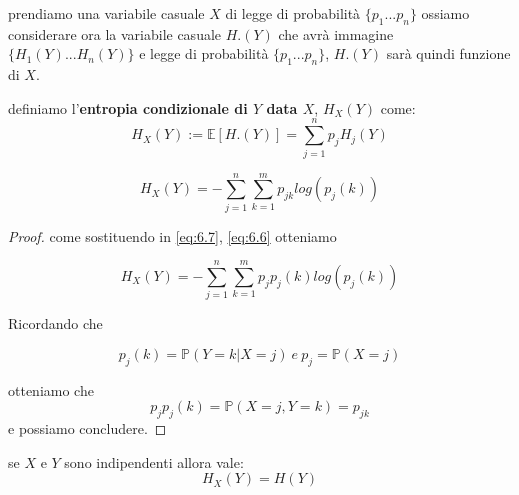 prendiamo una variabile casuale $X$ di legge di probabilità $\{ p _1...p_n\}$ ossiamo considerare ora la variabile casuale $H.(Y)$ che avrà immagine $\{H_1(Y)...H_n(Y) \}$ e legge di probabilità $\{ p _1...p_n\}$, $H.(Y)$ sarà quindi funzione di $X$.
\begin{defi}
definiamo l'\textbf{entropia condizionale di $Y$ data $X$}, $H_X(Y)$ come:
\begin{equation}\label{eq:6.7}
H_X(Y):= \mathbb{E}[H.(Y)]= \sum_{j=1}^n p_j H_j(Y)
\end{equation}
\end{defi}



\begin{lem}
\begin{equation}
H_X(Y)=-\sum_{j=1}^n\sum_{k=1}^m p_{jk}log(p_j(k))
\end{equation}
\end{lem}
\begin{proof}
come sostituendo in \ref{eq:6.7}, \ref{eq:6.6} otteniamo

$$H_X(Y)=-\sum_{j=1}^n\sum_{k=1}^m p_{j}p_j(k)log(p_j(k))$$

Ricordando che 

$$p_j(k)=\mathbb{P}(Y=k|X=j)\ e \ p_j=\mathbb{P}(X=j)$$

otteniamo che 
$$p_jp_j(k)=\mathbb{P}(X=j,Y=k)=p_{jk}$$
e possiamo concludere.
\end{proof}


\begin{lem}
se $X$ e $Y$ sono indipendenti allora vale:
\begin{equation}
H_X(Y)=H(Y)
\end{equation}
\end{lem}


















